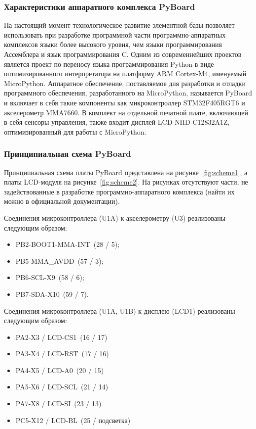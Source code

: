 \documentclass[document.tex]{subfiles}
\begin{document}
\subsubsection{Характеристики аппаратного комплекса PyBoard}
На настоящий момент технологическое развитие элементной базы позволяет использовать при разработке программной части программно-аппаратных комп\-лексов языки более высоко\-го
уровня, чем языки программирования Ассемблера и язык программирования C. Одним из современнейших проектов является проект по переносу языка программирования Python в виде оптимизированного
интерпретатора на платформу ARM Cortex-M4, именуемый MicroPython. Аппа\-ратное обеспечение, поставляемое для разработки и отладки программного обес\-печения, разработанного на
MicroPython, называется PyBoard и включает в себя такие компоненты как микроконтроллер STM32F405RGT6 и акселерометр MMA7660. В комплект на отдельной печатной плате, включающей в
себя сенсоры управления, также входит дисплей LCD-NHD-C12832A1Z, оптимизи\-рованный для работы с MicroPython.\cite{pyboard_hardware}

\clearpage
\subsubsection{Принципиальная схема PyBoard}
Принципиальная схема платы PyBoard представлена на рисунке~\ref{fig:scheme1}, а платы LCD-модуля на рисунке~\ref{fig:scheme2}. На рисунках отсутствуют части, не задействованные в
разработке программно-аппаратного комплекса (найти их можно в официаль\-ной документации).

Соединения микроконтроллера (U1A) к акселерометру (U3) реализованы следующим образом:
\begin{itemize}
	\item PB2-BOOT1-MMA-INT~(28 / 5);
	\item PB5-MMA\_AVDD~(57 / 3);
	\item PB6-SCL-X9~(58 / 6);
	\item PB7-SDA-X10~(59 / 7).
\end{itemize}

Соединения микроконтроллера (U1A, U1B) к дисплею (LCD1) реализованы следующим образом:
\begin{itemize}
	\item PA2-X3 / LCD-CS1~(16 / 17)
	\item PA3-X4 / LCD-RST~(17 / 16)
	\item PA4-X5 / LCD-A0~(20 / 15)
	\item PA5-X6 / LCD-SCL~(21 / 14)
	\item PA7-X8 / LCD-SI~(23 / 13)
	\item PC5-X12 / LCD-BL~(25 / подсветка)
\end{itemize}
\end{document}
